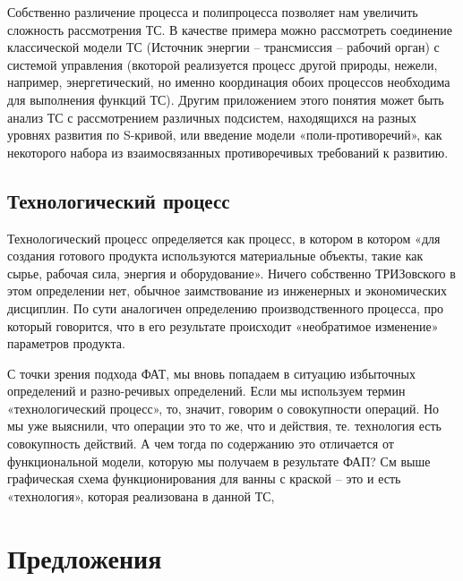 \documentclass[11pt,a4paper]{article}
\begin{document}
Собственно различение процесса и полипроцесса позволяет нам увеличить
сложность рассмотрения ТС. В качестве примера можно рассмотреть соединение
классической модели ТС (Источник энергии – трансмиссия – рабочий орган) с
системой управления (вкоторой реализуется процесс другой природы, нежели,
например, энергетический, но именно координация обоих процессов необходима для
выполнения функций ТС). Другим приложением этого понятия может быть анализ ТС
с рассмотрением различных подсистем, находящихся на разных уровнях развития по
S-кривой, или введение модели «поли-противоречий», как некоторого набора из
взаимосвязанных противоречивых требований к развитию.

\subsection{Технологический процесс}
Технологический процесс определяется как процесс, в котором в котором «для
создания готового продукта используются материальные объекты, такие как сырье,
рабочая сила, энергия и оборудование». Ничего собственно ТРИЗовского в этом
определении нет, обычное заимствование из инженерных и экономических
дисциплин. По сути аналогичен определению производственного процесса, про
который говорится, что в его результате происходит «необратимое изменение»
параметров продукта.

С точки зрения подхода ФАТ, мы вновь попадаем в ситуацию избыточных
определений и разно-речивых определений. Если мы используем термин
«технологический процесс», то, значит, говорим о совокупности операций. Но мы
уже выяснили, что операции это то же, что и действия, те. технология есть
совокупность действий. А чем тогда по содержанию это отличается от
функциональной модели, которую мы получаем в результате ФАП? См выше
графическая схема функционирования для ванны с краской – это и есть
«технология», которая реализована в данной ТС,

\section{Предложения}
\end{document}
